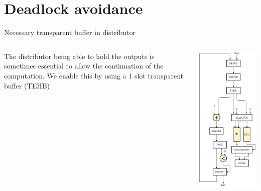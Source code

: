 \documentclass{beamer}
\begin{document}
\section{Deadlock avoidance}
\begin{frame}{Necessary transparent buffer in distributor}
    \begin{columns}[T]
    \begin{column}{0.45\textwidth}
    The distributor being able to hold the outputs is sometimes essential to allow the continuation of the computation. We enable this by using a 1 slot transparent buffer (TEHB)
    \end{column}
    \begin{column}{0.45\textwidth}    
    \begin{center}
      \includegraphics[scale=0.25]{shared_base_case.png}
    \end{center}
    \end{column}
  \end{columns}
\end{frame}
\end{document}
